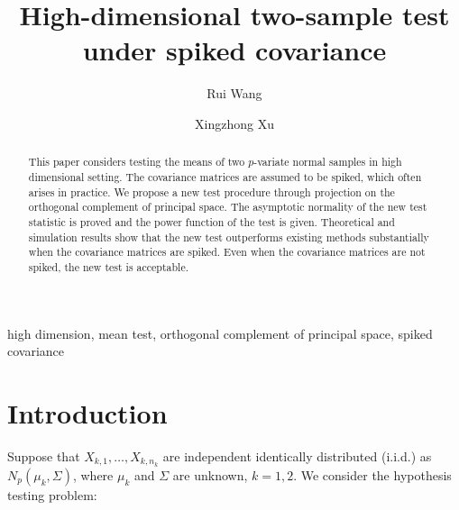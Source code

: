 \documentclass[review]{elsarticle}
\theoremstyle{plain}
\theoremstyle{definition}
\theoremstyle{remark}
\begin{document}
\begin{frontmatter}

\title{High-dimensional two-sample test under spiked covariance}

    \author[mymainaddress]{Rui Wang}
    \author[mymainaddress,mysecondaryaddress]{Xingzhong Xu}
    \address[mymainaddress]{School of Mathematics and Statistics, Beijing Institute of Technology, Beijing 
    100081,China}
    \address[mysecondaryaddress]{Beijing Key Laboratory on MCAACI, Beijing Institute of Technology, Beijing 100081,China}




\begin{abstract}
    This paper considers testing the means of two $p$-variate normal samples in high dimensional setting.  The covariance matrices are assumed to be spiked, which often arises in practice. 
    We propose a new test procedure through projection on the orthogonal complement of principal space.
    The asymptotic normality of the new test statistic is proved and the power function of the test is given.
    Theoretical and simulation results show that the new test outperforms existing methods substantially when the covariance matrices are spiked. Even when the covariance matrices are not spiked, the new test is acceptable.
\end{abstract}

\begin{keyword}
    high dimension, mean test, orthogonal complement of principal space, spiked covariance
\end{keyword}

\end{frontmatter}




\section{Introduction}

Suppose that $X_{k,1},\ldots,X_{k,n_k}$  are independent identically distributed (i.i.d.) as $N_p(\mu_k,\Sigma)$, where $\mu_k$ and $\Sigma$ are unknown, $k=1,2$. We consider the hypothesis testing problem:
\end{document}
